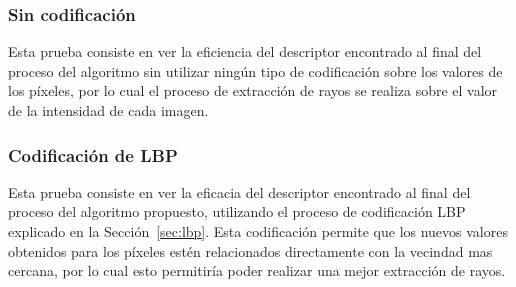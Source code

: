 	\subsubsection{Sin codificación}
	Esta prueba consiste en ver la eficiencia del descriptor encontrado al final del proceso del algoritmo sin utilizar ningún tipo de codificación sobre los valores de los píxeles, por lo cual el proceso de extracción de rayos se realiza sobre el valor de la intensidad de cada imagen.

	\subsubsection{Codificación de LBP}
	Esta prueba consiste en ver la eficacia del descriptor encontrado al final del proceso del algoritmo propuesto, utilizando el proceso de codificación LBP explicado en la Sección~\ref{sec:lbp}. Esta codificación permite que los nuevos valores obtenidos para los píxeles estén relacionados directamente con la vecindad mas cercana, por lo cual esto permitiría poder realizar una mejor extracción de rayos.
